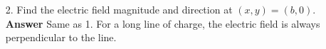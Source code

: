 \documentclass{article}
\begin{document}
%

\begin{enumerate}

  \item[2.] Find the electric field magnitude and direction at $(x,y)=(b,0)$.\\

            \textbf{Answer} Same as 1. For a long line of charge, the electric field is always perpendicular to the line.

\end{enumerate}
\end{document}
